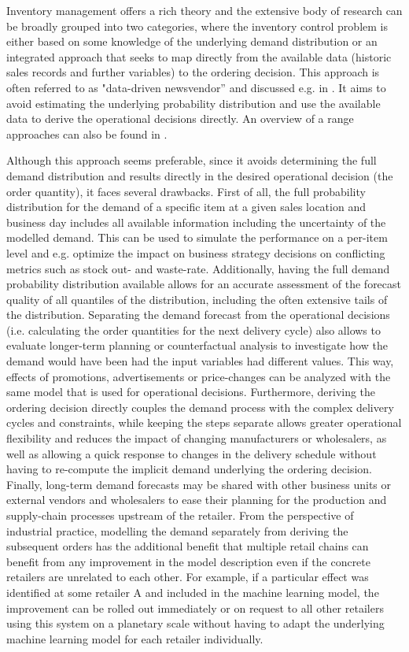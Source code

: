 \documentclass[BCOR=1mm, DIV=calc,10pt,
twoside=true,
twocolumn,
headings=normal]{scrartcl}
\begin{document}
Inventory management offers a rich theory and the extensive body of research can be broadly grouped into two categories, where the inventory control problem is either based on some knowledge of the underlying demand  distribution or an integrated approach that seeks to map directly from the available data (historic sales records and further variables) to the ordering decision. This approach is often referred to as "data-driven newsvendor'' and discussed  e.g. in \cite{beutel2012safety,ban2019big,bertsimas2020predictive, oroojlooyjadid2020applying}. It aims to avoid estimating the underlying probability distribution and use the available data to derive the operational decisions directly.  An overview of a range approaches can also be found in \cite{huber2019data}.

Although this approach seems preferable, since it avoids determining the full demand distribution and results directly in the desired operational decision (the order quantity), it faces several drawbacks. First of all, the full probability distribution for the demand of a specific item at a given sales location and business day includes all available information including the uncertainty of the modelled demand. This can be used to simulate the performance on a per-item level and e.g. optimize the impact on business strategy decisions on conflicting metrics such as stock out- and waste-rate. Additionally, having the full demand probability distribution available allows for an accurate assessment of the forecast quality of all quantiles of the distribution, including the often extensive tails of the distribution. Separating the demand forecast from the operational decisions (i.e. calculating the  order quantities for the next delivery cycle) also allows to evaluate longer-term planning or counterfactual analysis to investigate how the demand would have been had the input variables had different values. This way, effects of promotions, advertisements or price-changes can be analyzed  with the same model that is used for operational decisions. Furthermore, deriving the ordering decision directly couples the demand process with the complex delivery cycles and constraints, while keeping the steps separate allows greater operational flexibility and reduces the impact of changing manufacturers or wholesalers, as well as  allowing a quick response to changes in the delivery schedule without having to re-compute the implicit demand underlying the ordering decision. Finally, long-term demand forecasts may be shared with other business units or external vendors  and wholesalers to ease their planning for the production and supply-chain processes upstream of the retailer. From the perspective of industrial practice, modelling the demand separately from deriving the subsequent orders  has the additional benefit that multiple retail chains can benefit from any improvement in the model description even if the concrete retailers are unrelated to each other. For example, if a particular effect was identified at some retailer A and included in the machine learning model, the improvement can be rolled out immediately or on request to all other retailers using this system on a planetary scale without having to adapt the underlying machine learning model for each retailer individually.
\end{document}
